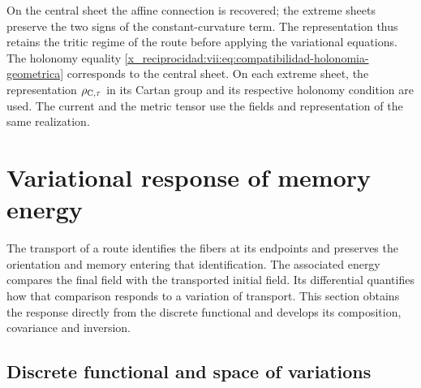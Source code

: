 On the central sheet the affine connection is recovered; the extreme sheets
preserve the two signs of the constant-curvature term. The
representation thus retains the tritic regime of the route before
applying the variational equations. The holonomy equality
\eqref{x_reciprocidad:vii:eq:compatibilidad-holonomia-geometrica} corresponds to the
central sheet. On each extreme sheet, the representation
\(\rho_{{\rm C},\tau}\) in its Cartan group and its respective holonomy
condition are used. The current and the metric tensor use
the fields and representation of the same realization.




\chapter{Variational response of memory energy}
\label{x_reciprocidad:vii:sec:variacion-memoria}

The transport of a route identifies the fibers at its endpoints and preserves
the orientation and memory entering that identification. The associated
energy compares the final field with the transported initial field. Its
differential quantifies how that comparison responds to a variation of
transport. This section obtains the response directly from the discrete
functional and develops its composition, covariance and inversion.

\section{Discrete functional and space of variations}
\label{x_reciprocidad:vii:subsec:funcional-memoria}

